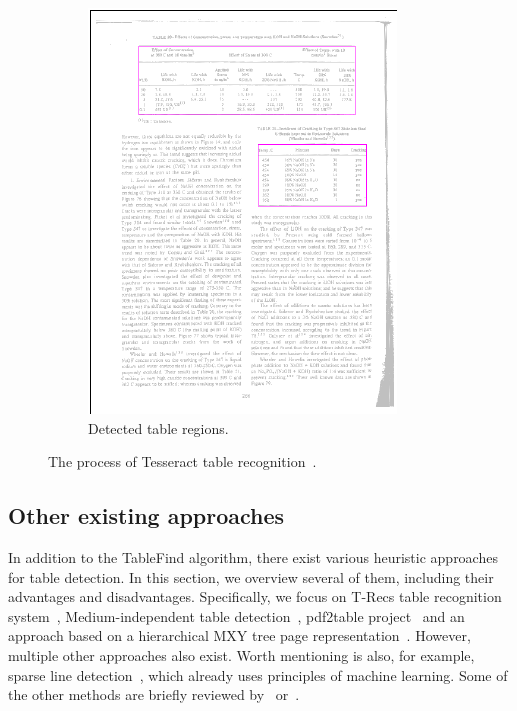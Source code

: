 \begin{figure}
\begin{subfigure}{0.30\textwidth}
\includegraphics[width=\linewidth]{img/tableDetection/tableDetectionResult.pdf}
\caption{Detected table regions.}
\label{fig:tessTableDet5}
\end{subfigure}
\caption{The process of Tesseract table recognition~\cite{tableDetHeterogeneous}.}
\label{fig:tesseractTableRecognition}
\end{figure}

\subsection{Other existing approaches}

In addition to the TableFind algorithm, there exist various heuristic approaches for table detection. In this section, we overview several of them, including their advantages and disadvantages. Specifically, we focus on T-Recs table recognition system~\citep{TRecs}, Medium-independent table detection~\citep{MediumTable}, pdf2table project~\cite{pdf2table} and an approach based on a hierarchical MXY tree page representation~\citep{tableDetectCesarini}. However, multiple other approaches also exist. Worth mentioning is also, for example, sparse line detection~\cite{sparseLineDetection}, which already uses principles of machine learning. Some of the other methods are briefly reviewed by~\citet{otherDetection1} or~\citet{otherDetection2}.

